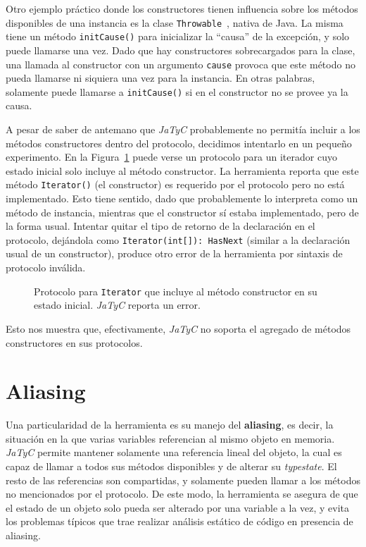 Otro ejemplo práctico donde los constructores tienen influencia sobre los métodos disponibles de una instancia es la clase \texttt{Throwable}~\cite{java-docs:throwable}, nativa de Java. La misma tiene un método \texttt{initCause()} para inicializar la ``causa'' de la excepción, y solo puede llamarse una vez. Dado que hay constructores sobrecargados para la clase, una llamada al constructor con un argumento \texttt{cause} provoca que este método no pueda llamarse ni siquiera una vez para la instancia. En otras palabras, solamente puede llamarse a \texttt{initCause()} si en el constructor no se provee ya la causa.

A pesar de saber de antemano que \textit{JaTyC} probablemente no permitía incluir a los métodos constructores dentro del protocolo, decidimos intentarlo en un pequeño experimento. En la Figura~\ref{exp:constructor} puede verse un protocolo para un iterador cuyo estado inicial solo incluye al método constructor. La herramienta reporta que este método \texttt{Iterator()} (el constructor) es requerido por el protocolo pero no está implementado. Esto tiene sentido, dado que probablemente lo interpreta como un método de instancia, mientras que el constructor sí estaba implementado, pero de la forma usual. Intentar quitar el tipo de retorno de la declaración en el protocolo, dejándola como \texttt{Iterator(int[]): HasNext} (similar a la declaración usual de un constructor), produce otro error de la herramienta por sintaxis de protocolo inválida.

\begin{figure}[htbp]
    \centering
    
    \vspace{0.3cm}
    
    \caption{Protocolo para \texttt{Iterator} que incluye al método constructor en su estado inicial. \textit{JaTyC} reporta un error.}
    \label{exp:constructor}
\end{figure}

Esto nos muestra que, efectivamente, \textit{JaTyC} no soporta el agregado de métodos constructores en sus protocolos.

\section{Aliasing}
\label{sec:aliasing}

Una particularidad de la herramienta es su manejo del \textbf{aliasing}, es decir, la situación en la que varias variables referencian al mismo objeto en memoria. \textit{JaTyC} permite mantener solamente una referencia lineal del objeto, la cual es capaz de llamar a todos sus métodos disponibles y de alterar su \textit{typestate}. El resto de las referencias son compartidas, y solamente pueden llamar a los métodos no mencionados por el protocolo. De este modo, la herramienta se asegura de que el estado de un objeto solo pueda ser alterado por una variable a la vez, y evita los problemas típicos que trae realizar análisis estático de código en presencia de aliasing.

